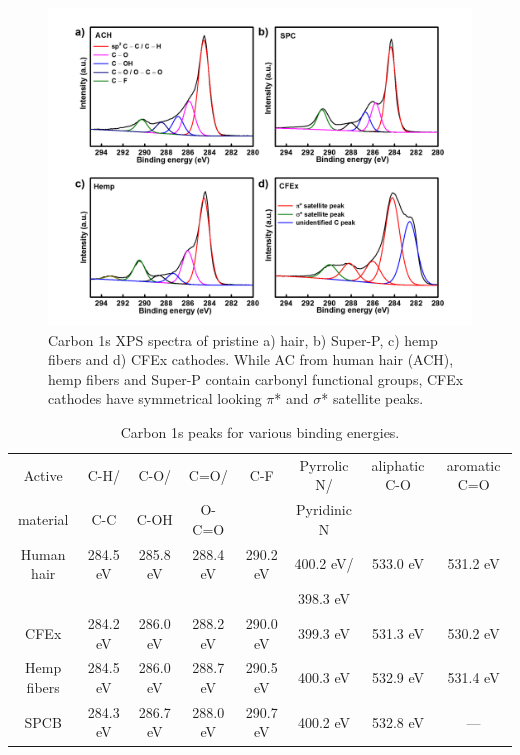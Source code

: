 \documentclass{article}
\begin{document}
\begin{figure}
  \centering
  \includegraphics[width=\textwidth]{fig/XPSC}
    \caption{Carbon 1s XPS spectra of pristine a) hair, b) Super-P, c) hemp fibers and d) CFEx cathodes. While AC from human hair (ACH), hemp fibers and Super-P contain carbonyl functional groups, CFEx cathodes have symmetrical looking $\pi$* and $\sigma$* satellite peaks.}
  \label{fig:XPSC}
\end{figure}

\begin{table}
\caption{Carbon 1s peaks for various binding energies.} \label{table2}
\begin{tabular}{|cccccccc|}
\hline
Active & C-H/ & C-O/ & C=O/ & C-F & Pyrrolic N/ & aliphatic C-O & aromatic C=O\\
material & C-C & C-OH & O-C=O & & Pyridinic N & & \\
\hline
Human hair & 284.5 eV & 285.8 eV & 288.4 eV & 290.2 eV & 400.2 eV/ & 533.0 eV & 531.2 eV\\
& & & & & 398.3 eV & & \\
CFEx & 284.2 eV & 286.0 eV & 288.2 eV & 290.0 eV & 399.3 eV & 531.3 eV & 530.2 eV\\
Hemp fibers & 284.5 eV & 286.0 eV & 288.7 eV & 290.5 eV & 400.3 eV & 532.9 eV & 531.4 eV\\
SPCB & 284.3 eV & 286.7 eV & 288.0 eV & 290.7 eV & 400.2 eV & 532.8 eV & ---\\
\hline
\end{tabular}
\end{table}
\end{document}
